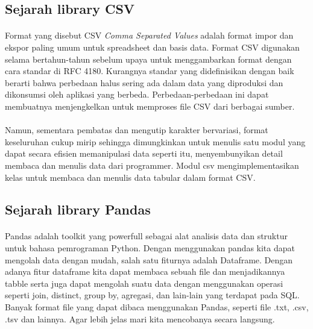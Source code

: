\documentclass{article}
\begin{document}
    \subsection{Sejarah library CSV}
        \paragraph{} Format yang disebut CSV \textit{Comma Separated Values} adalah format impor dan ekspor paling umum untuk spreadsheet dan basis data. Format CSV digunakan selama bertahun-tahun sebelum upaya untuk menggambarkan format dengan cara standar di RFC 4180. Kurangnya standar yang didefinisikan dengan baik berarti bahwa perbedaan halus sering ada dalam data yang diproduksi dan dikonsumsi oleh aplikasi yang berbeda. Perbedaan-perbedaan ini dapat membuatnya menjengkelkan untuk memproses file CSV dari berbagai sumber.
        \paragraph{}Namun, sementara pembatas dan mengutip karakter bervariasi, format keseluruhan cukup mirip sehingga dimungkinkan untuk menulis satu modul yang dapat secara efisien memanipulasi data seperti itu, menyembunyikan detail membaca dan menulis data dari programmer. Modul csv mengimplementasikan kelas untuk membaca dan menulis data tabular dalam format CSV.
        
    \subsection{Sejarah library Pandas}
        \paragraph{}Pandas adalah toolkit yang powerfull sebagai alat analisis data dan struktur untuk bahasa pemrograman Python. Dengan menggunakan pandas kita dapat mengolah data dengan mudah, salah satu fiturnya adalah Dataframe. Dengan adanya fitur dataframe kita dapat membaca sebuah file dan menjadikannya tabble serta juga dapat mengolah suatu data dengan menggunakan operasi seperti join, distinct, group by, agregasi, dan lain-lain yang terdapat pada SQL. Banyak format file yang dapat dibaca menggunakan Pandas, seperti file .txt, .csv, .tsv dan lainnya. Agar lebih jelas mari kita mencobanya secara langsung.
    
\end{document}
